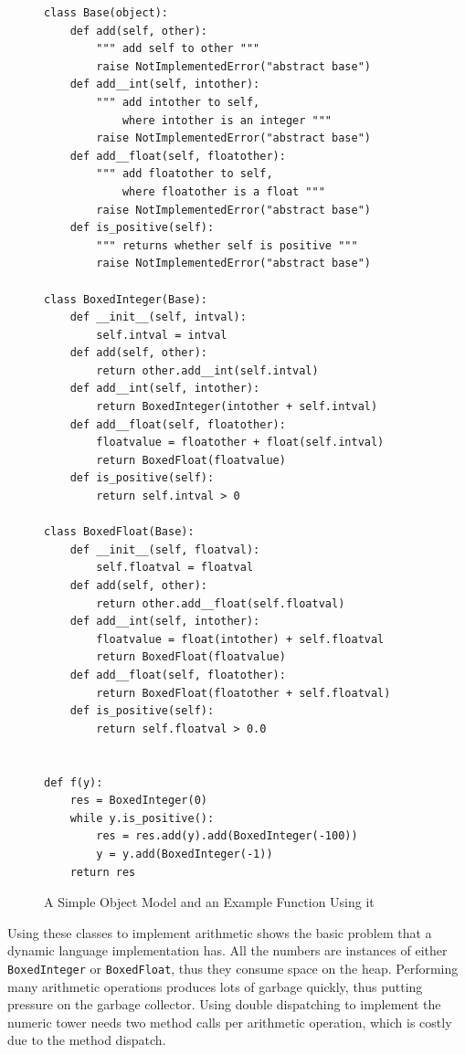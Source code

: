 \documentclass{sigplanconf}
\begin{document}
\begin{figure}
\begin{verbatim}
class Base(object):
    def add(self, other):
        """ add self to other """
        raise NotImplementedError("abstract base")
    def add__int(self, intother):
        """ add intother to self,
            where intother is an integer """
        raise NotImplementedError("abstract base")
    def add__float(self, floatother):
        """ add floatother to self,
            where floatother is a float """
        raise NotImplementedError("abstract base")
    def is_positive(self):
        """ returns whether self is positive """
        raise NotImplementedError("abstract base")

class BoxedInteger(Base):
    def __init__(self, intval):
        self.intval = intval
    def add(self, other):
        return other.add__int(self.intval)
    def add__int(self, intother):
        return BoxedInteger(intother + self.intval)
    def add__float(self, floatother):
        floatvalue = floatother + float(self.intval)
        return BoxedFloat(floatvalue)
    def is_positive(self):
        return self.intval > 0

class BoxedFloat(Base):
    def __init__(self, floatval):
        self.floatval = floatval
    def add(self, other):
        return other.add__float(self.floatval)
    def add__int(self, intother):
        floatvalue = float(intother) + self.floatval
        return BoxedFloat(floatvalue)
    def add__float(self, floatother):
        return BoxedFloat(floatother + self.floatval)
    def is_positive(self):
        return self.floatval > 0.0


def f(y):
    res = BoxedInteger(0)
    while y.is_positive():
        res = res.add(y).add(BoxedInteger(-100))
        y = y.add(BoxedInteger(-1))
    return res
\end{verbatim}
\caption{A Simple Object Model and an Example Function Using it}
\label{fig:objmodel}
\end{figure}

Using these classes to implement arithmetic shows the basic problem that a
dynamic language implementation has. All the numbers are instances of either
\texttt{BoxedInteger} or \texttt{BoxedFloat}, thus they consume space on the
heap. Performing many arithmetic operations produces lots of garbage quickly,
thus putting pressure on the garbage collector. Using double dispatching to
implement the numeric tower needs two method calls per arithmetic operation,
which is costly due to the method dispatch.
\end{document}
